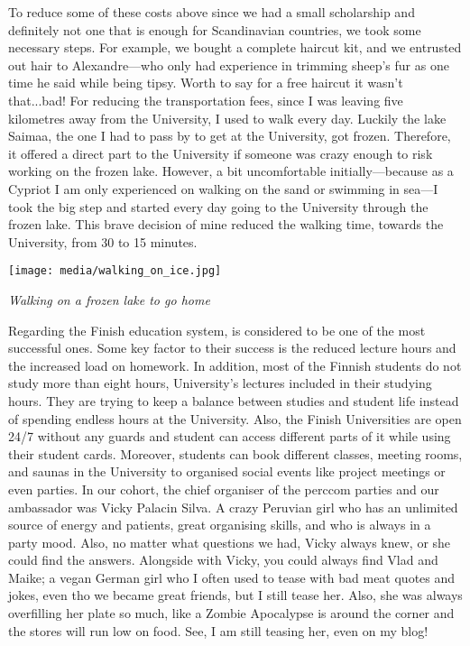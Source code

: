 \documentclass[10pt,a4paper]{article} %
\begin{document}
\begin{multicols}{3}
To reduce some of these costs above since we had a small scholarship and 
definitely not one that is enough for Scandinavian countries, we took some 
necessary steps. 
For example, we bought a complete haircut kit, and we entrusted out hair to 
Alexandre---who only had experience in trimming sheep's fur as one time he said 
while being tipsy.  
Worth to say for a free haircut it wasn't that...bad! 
For reducing the transportation fees, since I was leaving five kilometres away from 
the University, I used to walk every day. 
Luckily the lake Saimaa, the one I had to pass by to get at the University, got 
frozen. 
Therefore, it offered a direct part to the University if someone was crazy enough 
to risk working on the frozen lake. 
However, a bit uncomfortable initially---because as a Cypriot I am only experienced 
on walking on the sand or swimming in sea---I took the big step and started every day 
going to the University through the frozen lake.
This brave decision of mine reduced the walking time, towards the University, from 
30 to 15 minutes.

\begin{center}
	\texttt{[image: media/walking\_on\_ice.jpg]}
	\par\textit{Walking on a frozen lake to go home}
\end{center}

Regarding the Finish education system, is considered to be one of the most successful 
ones. 
Some key factor to their success is the reduced lecture hours and the increased 
load on homework. 
In addition, most of the Finnish students do not study more than eight hours, 
University's lectures included in their studying hours. 
They are trying to keep a balance between studies and student life instead of 
spending endless hours at the University. 
Also, the Finish Universities are open 24/7 without any guards and student can 
access different parts of it while using their student cards. 
Moreover, students can book different classes, meeting rooms, and saunas 
in the University to organised social events like project meetings or even parties. 
In our cohort, the chief organiser of the {\sc perccom} parties and our ambassador was 
Vicky Palacin Silva. 
A crazy Peruvian girl who has an unlimited source of energy and patients, great 
organising skills, and who is always in a party mood. 
Also, no matter what questions we had, Vicky always knew, or she could 
find the answers. 
Alongside with Vicky, you could always find Vlad and Maike; a vegan German girl 
who I often used to tease with bad meat quotes and jokes, even tho we became 
great friends, but I still tease her.
Also, she was always overfilling her plate so much,
like a Zombie Apocalypse is around the corner and the stores will run low on food.
See, I am still teasing her, even on my blog!


\end{multicols}
\end{document}
